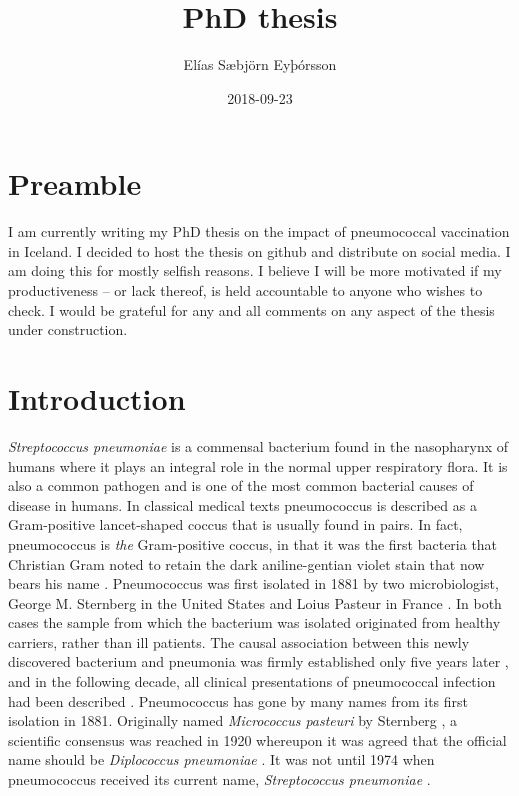 \documentclass[]{book}
\title{PhD thesis}
\author{Elías Sæbjörn Eyþórsson}
\date{2018-09-23}
\theoremstyle{definition}
\theoremstyle{definition}
\theoremstyle{definition}
\theoremstyle{remark}
\begin{document}
\maketitle

{
\setcounter{tocdepth}{1}
\tableofcontents
}
\chapter{Preamble}\label{preamble}

I am currently writing my PhD thesis on the impact of pneumococcal
vaccination in Iceland. I decided to host the thesis on github and
distribute on social media. I am doing this for mostly selfish reasons.
I believe I will be more motivated if my productiveness -- or lack
thereof, is held accountable to anyone who wishes to check. I would be
grateful for any and all comments on any aspect of the thesis under
construction.

\chapter{Introduction}\label{intro}

\emph{Streptococcus pneumoniae} is a commensal bacterium found in the
nasopharynx of humans where it plays an integral role in the normal
upper respiratory flora. It is also a common pathogen and is one of the
most common bacterial causes of disease in humans. In classical medical
texts pneumococcus is described as a Gram-positive lancet-shaped coccus
that is usually found in pairs. In fact, pneumococcus is \emph{the}
Gram-positive coccus, in that it was the first bacteria that Christian
Gram noted to retain the dark aniline-gentian violet stain that now
bears his name \citep{Gram1884}. Pneumococcus was first isolated in 1881
by two microbiologist, George M. Sternberg in the United States and
Loius Pasteur in France \citep{Pasteur1881, Sternberg1881, Watson1993}.
In both cases the sample from which the bacterium was isolated
originated from healthy carriers, rather than ill patients. The causal
association between this newly discovered bacterium and pneumonia was
firmly established only five years later \citep{Weichselbaum1886}, and
in the following decade, all clinical presentations of pneumococcal
infection had been described \citep{Austrian1981}. Pneumococcus has gone
by many names from its first isolation in 1881. Originally named
\emph{Micrococcus pasteuri} by Sternberg \citep{Sternberg1881}, a
scientific consensus was reached in 1920 whereupon it was agreed that
the official name should be \emph{Diplococcus pneumoniae}
\citep{Winslow1920}. It was not until 1974 when pneumococcus received
its current name, \emph{Streptococcus pneumoniae} \citep{Deibel1974}.
\end{document}
